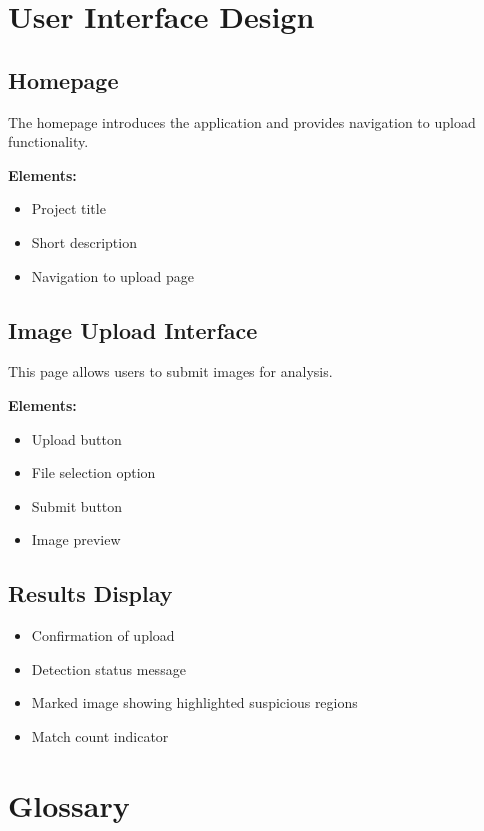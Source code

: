\documentclass[12pt]{article}
\begin{document}
\section{User Interface Design}

\subsection{Homepage}

The homepage introduces the application and provides navigation to upload functionality.

\textbf{Elements:}
\begin{itemize}[noitemsep]
    \item Project title
    \item Short description
    \item Navigation to upload page
\end{itemize}

\subsection{Image Upload Interface}

This page allows users to submit images for analysis.

\textbf{Elements:}
\begin{itemize}[noitemsep]
    \item Upload button
    \item File selection option
    \item Submit button
    \item Image preview
\end{itemize}

\subsection{Results Display}

\begin{itemize}[noitemsep]
    \item Confirmation of upload
    \item Detection status message
    \item Marked image showing highlighted suspicious regions
    \item Match count indicator
\end{itemize}

\section{Glossary}
\end{document}
